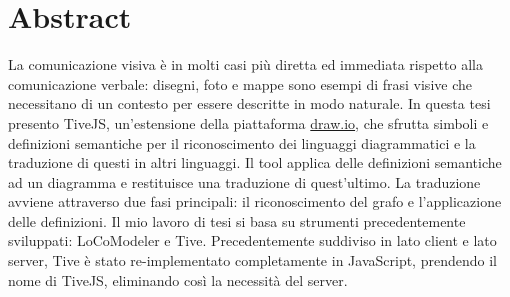 \chapter*{Abstract}

    La comunicazione visiva è in molti casi più diretta ed immediata rispetto alla comunicazione verbale: disegni, foto e mappe sono esempi di frasi visive che necessitano di un contesto per essere descritte in modo naturale.
    \newline
    In questa tesi presento TiveJS, un'estensione della piattaforma \href{https://www.draw.io/}{draw.io}, che sfrutta  simboli e  definizioni semantiche per il riconoscimento dei linguaggi diagrammatici e la traduzione di questi in altri linguaggi.
    Il tool applica  delle definizioni semantiche  ad un diagramma e restituisce una traduzione di quest'ultimo. La traduzione avviene attraverso due fasi principali: il riconoscimento del grafo e l'applicazione delle definizioni.
    \newline
    Il mio lavoro di tesi si basa su strumenti precedentemente sviluppati: LoCoModeler e Tive. Precedentemente suddiviso in lato client e lato server, Tive è stato re-implementato completamente in JavaScript, prendendo il nome di TiveJS, eliminando così la necessità del server.